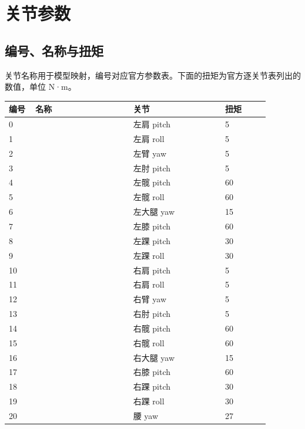 \chapter{关节参数}
\label{app:joints}
\small\renewcommand{\arraystretch}{1.12}
\section{编号、名称与扭矩}
关节名称用于模型映射，编号对应官方参数表。下面的扭矩为官方逐关节表列出的数值，单位 N·m。

\begingroup\small\renewcommand{\arraystretch}{1.15}
\begin{longtable}{@{}P{0.09\linewidth}P{0.33\linewidth}P{0.31\linewidth}P{0.15\linewidth}@{}}
\toprule
\textbf{编号} & \textbf{名称} & \textbf{关节} & \textbf{扭矩} \\
\midrule{} &  & 左肩 pitch & 5 \\
1 &  & 左肩 roll & 5 \\
2 &  & 左臂 yaw & 5 \\
3 &  & 左肘 pitch & 5 \\
4 &  & 左髋 pitch & 60 \\
5 &  & 左髋 roll & 60 \\
6 &  & 左大腿 yaw & 15 \\
7 &  & 左膝 pitch & 60 \\
8 &  & 左踝 pitch & 30 \\
9 &  & 左踝 roll & 30 \\
10 &  & 右肩 pitch & 5 \\
11 &  & 右肩 roll & 5 \\
12 &  & 右臂 yaw & 5 \\
13 &  & 右肘 pitch & 5 \\
14 &  & 右髋 pitch & 60 \\
15 &  & 右髋 roll & 60 \\
16 &  & 右大腿 yaw & 15 \\
17 &  & 右膝 pitch & 60 \\
18 &  & 右踝 pitch & 30 \\
19 &  & 右踝 roll & 30 \\
20 &  & 腰 yaw & 27 \\
\bottomrule\end{longtable}\endgroup

